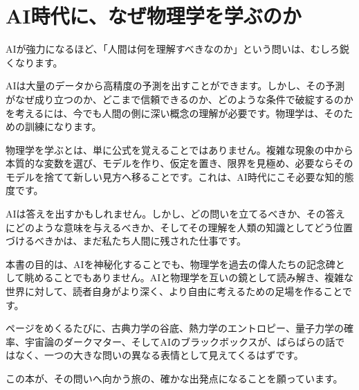 \section*{AI時代に、なぜ物理学を学ぶのか}

AIが強力になるほど、「人間は何を理解すべきなのか」という問いは、むしろ鋭くなります。

AIは大量のデータから高精度の予測を出すことができます。しかし、その予測がなぜ成り立つのか、どこまで信頼できるのか、どのような条件で破綻するのかを考えるには、今でも人間の側に深い概念の理解が必要です。物理学は、そのための訓練になります。

物理学を学ぶとは、単に公式を覚えることではありません。複雑な現象の中から本質的な変数を選び、モデルを作り、仮定を置き、限界を見極め、必要ならそのモデルを捨てて新しい見方へ移ることです。これは、AI時代にこそ必要な知的態度です。

AIは答えを出すかもしれません。しかし、どの問いを立てるべきか、その答えにどのような意味を与えるべきか、そしてその理解を人類の知識としてどう位置づけるべきかは、まだ私たち人間に残された仕事です。

本書の目的は、AIを神秘化することでも、物理学を過去の偉人たちの記念碑として眺めることでもありません。AIと物理学を互いの鏡として読み解き、複雑な世界に対して、読者自身がより深く、より自由に考えるための足場を作ることです。

ページをめくるたびに、古典力学の谷底、熱力学のエントロピー、量子力学の確率、宇宙論のダークマター、そしてAIのブラックボックスが、ばらばらの話ではなく、一つの大きな問いの異なる表情として見えてくるはずです。

この本が、その問いへ向かう旅の、確かな出発点になることを願っています。
